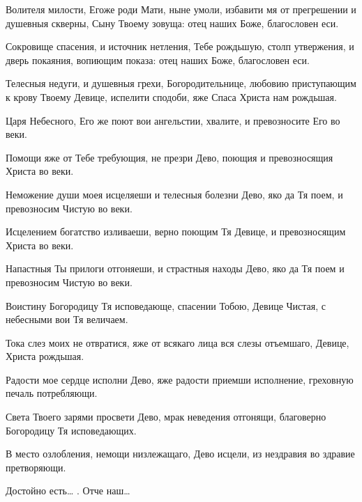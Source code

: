 \begin{mymulticols}

Волителя милости, Егоже роди Мати, ныне умоли, избавити мя от прегрешении и душевныя скверны, Сыну Твоему зовуща: отец наших Боже, благословен еси.

 Сокровище спасения, и источник нетления, Тебе рождьшую, столп утвержения, и дверь покаяния, вопиющим показа: отец наших Боже, благословен еси.

 Телесныя недуги, и душевныя грехи, Богородительнице, любовию приступающим к крову Твоему Девице, испелити сподоби, яже Спаса Христа нам рождьшая.



 Царя Небесного, Его же поют вои ангельстии, хвалите, и превозносите Его во веки.


Помощи яже от Тебе требующия, не презри Дево, поющия и превозносящия Христа во веки.


Неможение души моея исцеляеши и телесныя болезни Дево, яко да Тя поем, и превозносим Чистую во веки.

 Исцелением богатство изливаеши, верно поющим Тя Девице, и превозносящим Христа во веки.

 Напастныя Ты прилоги отгоняеши, и страстныя находы Дево, яко да Тя поем и превозносим Чистую во веки.



 Воистину Богородицу Тя исповедающе, спасении Тобою, Девице Чистая, с небесными вои Тя величаем.


Тока слез моих не отвратися, яже от всякаго лица вся слезы отъемшаго, Девице, Христа рождьшая.


Радости мое сердце исполни Дево, яже радости приемши исполнение, греховную печаль потребляющи.

 Света Твоего зарями просвети Дево, мрак неведения отгонящи, благоверно Богородицу Тя исповедающих.

 В место озлобления, немощи низлежащаго, Дево исцели, из нездравия во здравие претворяющи.

 Достойно есть… .  Отче наш… 



\end{mymulticols}
